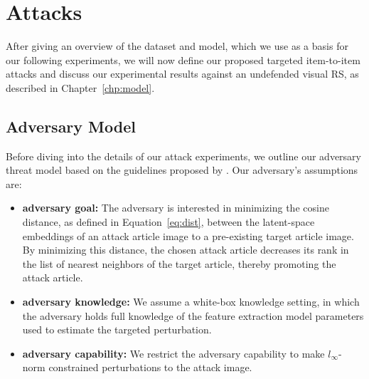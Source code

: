 \chapter{Attacks}
\label{chp:attacks}
After giving an overview of the dataset and model, which we use as a basis for our following experiments, we will now define our proposed targeted item-to-item attacks and discuss our experimental results against an undefended visual \acl{RS}, as described in Chapter~\ref{chp:model}.

\section{Adversary Model}
\label{sec:adv-model}
Before diving into the details of our attack experiments, we outline our adversary threat model based on the guidelines proposed by \cite{carlini2017towards}. Our adversary's assumptions are:
\begin{itemize}
	\item \textbf{adversary goal:} The adversary is interested in minimizing the cosine distance, as defined in Equation~\ref{eq:dist}, between the latent-space embeddings of an attack article image to a pre-existing target article image. By minimizing this distance, the chosen attack article decreases its rank in the list of nearest neighbors of the target article, thereby promoting the attack article.
	\item \textbf{adversary knowledge:} We assume a white-box knowledge setting, in which the adversary holds full knowledge of the feature extraction model parameters used to estimate the targeted perturbation. 
	\item \textbf{adversary capability:} We restrict the adversary capability to make $l_\infty$-norm constrained perturbations to the attack image.
\end{itemize}


